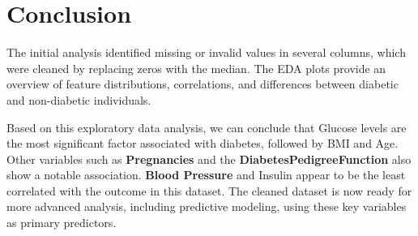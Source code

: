 \documentclass[12pt,a4paper]{article}
\begin{document}
\section{Conclusion}
The initial analysis identified missing or invalid values in several columns, which were cleaned by replacing zeros with the median. The EDA plots provide an overview of feature distributions, correlations, and differences between diabetic and non-diabetic individuals.

Based on this exploratory data analysis, we can conclude that Glucose levels are the most significant factor associated with diabetes, followed by BMI and Age. Other variables such as \textbf{Pregnancies} and the \textbf{DiabetesPedigreeFunction} also show a notable association. \textbf{Blood Pressure} and Insulin appear to be the least correlated with the outcome in this dataset. The cleaned dataset is now ready for more advanced analysis, including predictive modeling, using these key variables as primary predictors.
\end{document}
